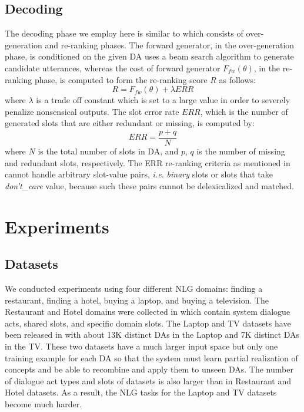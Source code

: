 \documentclass{llncs}
\begin{document}
\subsection{Decoding}\label{subsec:decoding}
The decoding phase we employ here is similar to \cite{tran2017natural} which consists of over-generation and re-ranking phases. The forward generator, in the over-generation phase, is conditioned on the given DA uses a beam search algorithm to generate candidate utterances, whereas the cost of forward generator $F_{fw}(\theta)$, in the re-ranking phase, is computed to form the re-ranking score $R$ as follows:
\begin{equation}\label{eq:r-score-1}
R = F_{fw}(\theta) + \lambda ERR
\end{equation}
where $\lambda$ is a trade off constant which is set to a large value in order to severely penalize nonsensical outputs. The slot error rate $ERR$, which is the number of generated slots that are either redundant or missing, is computed by:
\begin{equation}
ERR = \frac{p + q}{N}
\end{equation}
where $N$ is the total number of slots in DA, and $p$, $q$ is the number of missing and redundant slots, respectively. The ERR re-ranking criteria as mentioned in \cite{wensclstm15} cannot handle arbitrary slot-value pairs, \textit{i.e.} \textit{binary} slots or slots that take \textit{don’t\_care} value, because such these pairs cannot be delexicalized and matched.

\section{Experiments}\label{sec:experiments}
\subsection{Datasets}\label{subsec:datasets}
We conducted experiments using four different NLG domains: finding a restaurant, finding a hotel, buying a laptop, and buying a television. The Restaurant and Hotel domains were collected in \cite{wensclstm15} which contain system dialogue acts, shared slots, and specific domain slots. The Laptop and TV datasets have been released in \cite{wen2016multi} with about 13K distinct DAs in the Laptop and 7K distinct DAs in the TV. These two datasets have a much larger input space but only one training example for each DA so that the system must learn partial realization of concepts and be able to recombine and apply them to unseen DAs. The number of dialogue act types and slots of datasets is also larger than in Restaurant and Hotel datasets. As a result, the NLG tasks for the Laptop and TV datasets become much harder. 
\end{document}
